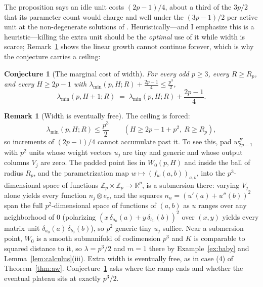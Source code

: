 \documentclass[11pt]{amsart}
\theoremstyle{plain}
\newtheorem{conjecture}[theorem]{Conjecture}
\theoremstyle{definition}
\newtheorem{remark}[theorem]{Remark}
\newcommand{\R}{\mathbb{R}}
\newcommand{\Z}{\mathbb{Z}}
\begin{document}
The proposition says an idle unit costs $(2p-1)/4$, about a third of the $3p/2$ that its parameter count would charge and well under the $(3p-1)/2$ per active unit at the non-degenerate solutions of \cite{cullen2026}. Heuristically---and I emphasize this is a heuristic---killing the extra unit should be the \emph{optimal} use of it while width is scarce; Remark~\ref{rem:ceiling} shows the linear growth cannot continue forever, which is why the conjecture carries a ceiling:

\begin{conjecture}[The marginal cost of width]\label{conj:increment}
For every odd $p \ge 3$, every $R \ge R_p$, and every $H \ge 2p-1$ with $\lambda_{\min}(p, H; R) + \frac{2p-1}{4} \le \frac{p^3}{2}$,
\[
   \lambda_{\min}(p, H+1; R) \;=\; \lambda_{\min}(p, H; R) + \frac{2p-1}{4}.
\]
\end{conjecture}

\begin{remark}[Width is eventually free]\label{rem:ceiling}
The ceiling is forced:
\[
 \lambda_{\min}(p,H;R)\le \frac{p^3}{2}
 \qquad
 (H\ge 2p-1+p^2,\ R\ge R_p),
\]
so increments of $(2p-1)/4$ cannot accumulate past it. To see this, pad $w^F_{2p-1}$ with $p^2$ units whose weight vectors $u_j$ are tiny and generic and whose output columns $V_j$ are zero. The padded point lies in $W_0(p,H)$ and inside the ball of radius $R_p$, and the parametrization map $w \mapsto (f_w(a,b))_{a,b}$, into the $p^3$-dimensional space of functions $\Z_p \times \Z_p \to \R^p$, is a submersion there: varying $V_j$ alone yields every function $n_j \otimes e_c$, and the squares $n_u = (u'(a)+u''(b))^2$ span the full $p^2$-dimensional space of functions of $(a,b)$ as $u$ ranges over any neighborhood of $0$ (polarizing $(x\,\delta_{a_0}(a) + y\,\delta_{b_0}(b))^2$ over $(x,y)$ yields every matrix unit $\delta_{a_0}(a)\,\delta_{b_0}(b)$), so $p^2$ generic tiny $u_j$ suffice. Near a submersion point, $W_0$ is a smooth submanifold of codimension $p^3$ and $K$ is comparable to squared distance to it, so $\lambda = p^3/2$ and $m = 1$ there by Example~\ref{ex:baby} and Lemma~\ref{lem:calculus}(iii). Extra width is eventually free, as in case (4) of Theorem~\ref{thm:aw}. Conjecture~\ref{conj:increment} asks where the ramp ends and whether the eventual plateau sits at exactly $p^3/2$.
\end{remark}
\end{document}
